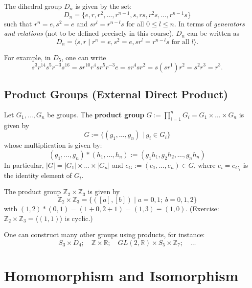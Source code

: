\begin{definition}
The dihedral group $D_n$ is given by the set:
\[ D_n = \{ e, r, r^2, \dots, r^{n-1}, s, rs, r^2s, \dots, r^{n-1}s \} \]
such that $r^n = e, s^2 = e$ and $s r^l = r^{n-l} s$ for all $0 \leq l \leq n$. In terms of {\it generators and relations} (not to be defined precisely in this course), $D_n$ can be written as
$$D_n = \langle s, r \mid r^n = e, s^2 = e, sr^l = r^{n-l}s \text{ for all } l \rangle.$$
\end{definition}

For example, in $D_5$, one can write 
 $$s^3 r^{14} s^5 r^{-3} s^{16} = s r^{10} r^4 s r^5 r^{-3} e = s r^4 s r^2 = s(s r^1) r^2 = s^2 r^3 = r^3.$$

\subsection*{Product Groups (External Direct Product)}

\begin{definition} 
Let $G_1, \dots, G_n$ be groups. The \textbf{product group} $G := \prod_{i=1}^n G_i = G_1 \times \dots \times G_n$ is given by 
$$G := \{ (g_1, \dots, g_n) \mid g_i \in G_i \}$$ 
whose multiplication is given by:
\[ (g_1, \dots, g_n) * (h_1, \dots, h_n) := (g_1 h_1, g_2 h_2, \dots, g_n h_n) \]
In particular, $|G| = |G_1| \times \dots \times |G_n|$ and $e_G := (e_1, \dots, e_n) \in G$, where $e_i = e_{G_i}$ is the identity element of $G_i$.
\end{definition}

\begin{example} The product group $\mathbb{Z}_2 \times \mathbb{Z}_3$ 
is given by 
$$\mathbb{Z}_2 \times \mathbb{Z}_3 = \{ ([a], [b]) \mid a = 0, 1;\ b = 0, 1, 2 \}$$
with $(1, 2) * (0, 1) = (1+0, 2+1) = (1, 3) \equiv (1, 0)$.
(Exercise: $\mathbb{Z}_2 \times \mathbb{Z}_3 = \langle (1, 1) \rangle$ is cyclic.)
\end{example}

One can construct many other groups using products, for instance: 
$$S_3 \times D_4;\quad \mathbb{Z} \times \mathbb{R} ;\quad GL(2, \mathbb{R}) \times S_5 \times \mathbb{Z}_7;\quad \dots$$

\section{Homomorphism and Isomorphism}


